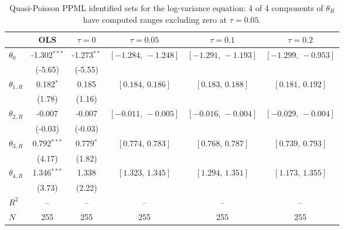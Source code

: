 \begin{table}[!htbp]
\centering
\begin{threeparttable}
\caption{Quasi-Poisson PPML identified sets for the log-variance equation: 4 of 4 components of $\theta_R$ have computed ranges excluding zero at $\tau{=}0.05$.}
\label{tab:log_var_eq_set_id}
\footnotesize\setlength{\tabcolsep}{3pt}
\begin{tabular}{lccccc}
\toprule
 & OLS & $\tau{=}0$ & $\tau{=}0.05$ & $\tau{=}0.1$ & $\tau{=}0.2$ \\
\midrule
$\theta_0$ & -1.302$^{***}$ & -1.273$^{**}$ & $[-1.284,\,-1.248]$ & $[-1.291,\,-1.193]$ & $[-1.299,\,-0.953]$ \\
 & (-5.65) & (-5.55) &  &  &  \\
\midrule
$\theta_{1,R}$ & 0.182$^{*}$ & 0.185 & $[0.184,\,0.186]$ & $[0.183,\,0.188]$ & $[0.181,\,0.192]$ \\
 & (1.78) & (1.16) &  &  &  \\
$\theta_{2,R}$ & -0.007 & -0.007 & $[-0.011,\,-0.005]$ & $[-0.016,\,-0.004]$ & $[-0.029,\,-0.004]$ \\
 & (-0.03) & (-0.03) &  &  &  \\
$\theta_{3,R}$ & 0.792$^{***}$ & 0.779$^{*}$ & $[0.774,\,0.783]$ & $[0.768,\,0.787]$ & $[0.739,\,0.793]$ \\
 & (4.17) & (1.82) &  &  &  \\
$\theta_{4,R}$ & 1.346$^{***}$ & 1.338 & $[1.323,\,1.345]$ & $[1.294,\,1.351]$ & $[1.173,\,1.355]$ \\
 & (3.73) & (2.22) &  &  &  \\
$R^2$ & -- & -- & -- & -- & -- \\
$N$ & 255 & 255 & 255 & 255 & 255 \\
\bottomrule
\end{tabular}
\begin{tablenotes}[flushleft]
\scriptsize

\end{tablenotes}
\end{threeparttable}
\end{table}
